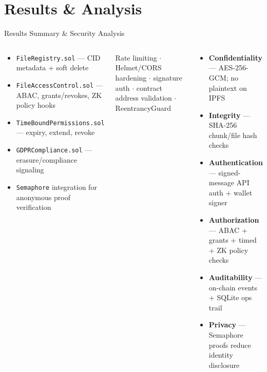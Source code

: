 \documentclass[aspectratio=169]{beamer}
\begin{document}
\section{Results \& Analysis}

\begin{frame}{Results Summary \& Security Analysis}
\tiny
\begin{columns}[t]
\begin{tcolorbox}[bluebox, title=\textbf{Smart Contracts Delivered}]
\begin{itemize}
  \setlength{\itemsep}{1.5pt}
  \setlength{\parskip}{0pt}
  \setlength{\parsep}{0pt}
  \item \texttt{FileRegistry.sol} --- CID metadata + soft delete
  \item \texttt{FileAccessControl.sol} --- ABAC, grants/revokes, ZK policy hooks
  \item \texttt{TimeBoundPermissions.sol} --- expiry, extend, revoke
  \item \texttt{GDPRCompliance.sol} --- erasure/compliance signaling
  \item \texttt{Semaphore} integration for anonymous proof verification
\end{itemize}
\end{tcolorbox}
\vspace{0.08cm}
\begin{tcolorbox}[greenbox, title=\textbf{Implemented Security Controls}]
\tiny\centering
Rate limiting $\cdot$ Helmet/CORS hardening $\cdot$ signature auth
$\cdot$ contract address validation $\cdot$ ReentrancyGuard
\end{tcolorbox}
\begin{tcolorbox}[redbox, title=\textbf{Security Guarantees (Code-backed)}]
\begin{itemize}
  \setlength{\itemsep}{1.5pt}
  \setlength{\parskip}{0pt}
  \setlength{\parsep}{0pt}
  \item \textbf{Confidentiality} --- AES-256-GCM; no plaintext on IPFS
  \item \textbf{Integrity} --- SHA-256 chunk/file hash checks
  \item \textbf{Authentication} --- signed-message API auth + wallet signer
  \item \textbf{Authorization} --- ABAC + grants + timed + ZK policy checks
  \item \textbf{Auditability} --- on-chain events + SQLite ops trail
  \item \textbf{Privacy} --- Semaphore proofs reduce identity disclosure
\end{itemize}
\end{tcolorbox}
\end{columns}
\end{frame}
\end{document}
